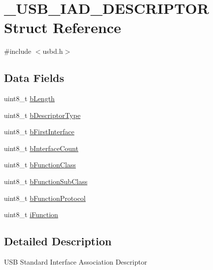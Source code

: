 \hypertarget{struct__USB__IAD__DESCRIPTOR}{\section{\-\_\-\-U\-S\-B\-\_\-\-I\-A\-D\-\_\-\-D\-E\-S\-C\-R\-I\-P\-T\-O\-R Struct Reference}
\label{struct__USB__IAD__DESCRIPTOR}
}


{\ttfamily \#include $<$usbd.\-h$>$}

\subsection*{Data Fields}
\begin{DoxyCompactItemize}
\item 
uint8\-\_\-t \hyperlink{struct__USB__IAD__DESCRIPTOR_a479007e955942af951b4f600a93f7453}{b\-Length}
\item 
uint8\-\_\-t \hyperlink{struct__USB__IAD__DESCRIPTOR_a3cb057fa923dfd71e2733fe638692687}{b\-Descriptor\-Type}
\item 
uint8\-\_\-t \hyperlink{struct__USB__IAD__DESCRIPTOR_a27e39686c573003d8d7a191139c959fd}{b\-First\-Interface}
\item 
uint8\-\_\-t \hyperlink{struct__USB__IAD__DESCRIPTOR_adbaa947d670f827e1c063614daa792fe}{b\-Interface\-Count}
\item 
uint8\-\_\-t \hyperlink{struct__USB__IAD__DESCRIPTOR_a4395c6765bf418652bcf73626731518b}{b\-Function\-Class}
\item 
uint8\-\_\-t \hyperlink{struct__USB__IAD__DESCRIPTOR_ace36407d116b50a76320813cd2174a8c}{b\-Function\-Sub\-Class}
\item 
uint8\-\_\-t \hyperlink{struct__USB__IAD__DESCRIPTOR_ab0aa68806b463f0ce4ffdcfb5c1bbba4}{b\-Function\-Protocol}
\item 
uint8\-\_\-t \hyperlink{struct__USB__IAD__DESCRIPTOR_a486ad14fb6b12d498212061b9610ce02}{i\-Function}
\end{DoxyCompactItemize}


\subsection{Detailed Description}
U\-S\-B Standard Interface Association Descriptor 

